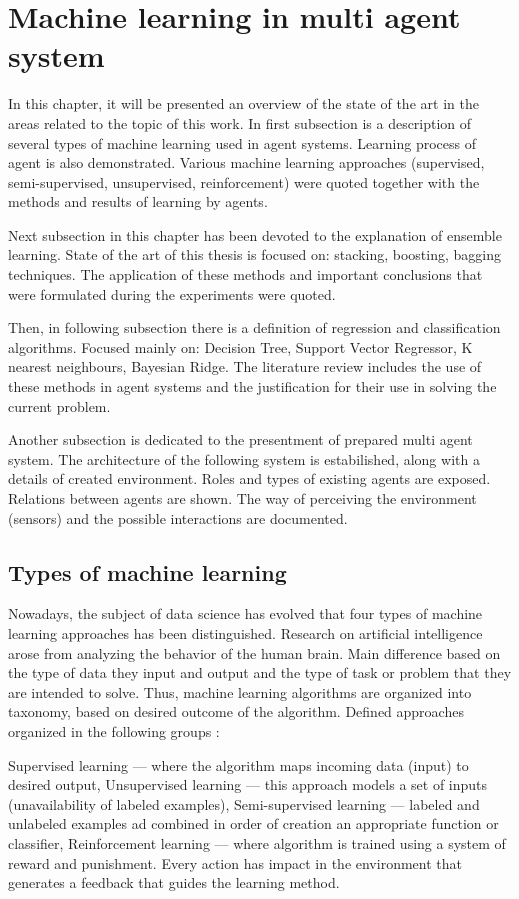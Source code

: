 
\chapter{Machine learning in multi agent system} 
\label{chap:Machine learning in multi agent system}

In this chapter, it will be presented an overview of the state of the art in the areas related to the topic of this work. In first subsection is a description of several types of machine learning used in agent systems. Learning process of agent is also demonstrated. Various machine learning approaches (supervised, semi-supervised, unsupervised, reinforcement) were quoted together with the methods and results of learning by agents.

Next subsection in this chapter has been devoted to the explanation of ensemble learning. State of the art of this thesis is focused on: stacking, boosting, bagging techniques. The application of these methods and important conclusions that were formulated during the experiments were quoted.

Then, in following subsection there is a definition of regression and classification algorithms. Focused mainly on: Decision Tree, Support Vector Regressor, K nearest neighbours, Bayesian Ridge. The literature review includes the use of these methods in agent systems and the justification for their use in solving the current problem.

Another subsection is dedicated to the presentment of prepared multi agent system. The architecture of the following system is estabilished, along with a details of created environment. Roles and types of existing agents are exposed. Relations between agents are shown. The way of perceiving the environment (sensors) and the possible interactions are documented. 

\newpage
\section{Types of machine learning}

Nowadays, the subject of data science has evolved that four types of machine learning approaches has been distinguished. Research on artificial intelligence arose from analyzing the behavior of the human brain. Main difference based on the type of data they input and output and the type of task or problem that they are intended to solve. Thus, machine learning algorithms are organized into taxonomy, based on desired outcome of the algorithm. 
Defined approaches organized in the following groups  \cite{TypesOfMachineLearning}:
\begin{outline}[]
	\1 Supervised learning --- where the algorithm maps incoming data (input) to desired output,
	\1 Unsupervised learning --- this approach models a set of inputs (unavailability of labeled examples),
	\1 Semi-supervised learning --- labeled and unlabeled examples ad combined in order of creation an appropriate function or classifier,
	\1 Reinforcement learning --- where algorithm is trained using a system of reward and punishment. Every action has impact in the environment that generates a feedback that guides the learning method.
\end{outline}

